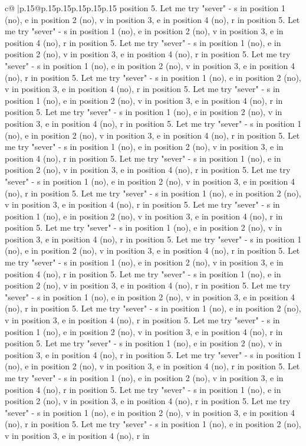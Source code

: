 \documentclass{article}
\begin{document}
{\begin{supertabular}{c@{$\;$}|p{.15\linewidth}@{}p{.15\linewidth}p{.15\linewidth}p{.15\linewidth}p{.15\linewidth}p{.15\linewidth}}
{{{position 5. Let me try "sever" {-} s in position 1 (no), e in position 2 (no), v in position 3, e in position 4 (no), r in position 5. Let me try "sever" {-} s in position 1 (no), e in position 2 (no), v in position 3, e in position 4 (no), r in position 5. Let me try "sever" {-} s in position 1 (no), e in position 2 (no), v in position 3, e in position 4 (no), r in position 5. Let me try "sever" {-} s in position 1 (no), e in position 2 (no), v in position 3, e in position 4 (no), r in position 5. Let me try "sever" {-} s in position 1 (no), e in position 2 (no), v in position 3, e in position 4 (no), r in position 5. Let me try "sever" {-} s in position 1 (no), e in position 2 (no), v in position 3, e in position 4 (no), r in position 5. Let me try "sever" {-} s in position 1 (no), e in position 2 (no), v in position 3, e in position 4 (no), r in position 5. Let me try "sever" {-} s in position 1 (no), e in position 2 (no), v in position 3, e in position 4 (no), r in position 5. Let me try "sever" {-} s in position 1 (no), e in position 2 (no), v in position 3, e in position 4 (no), r in position 5. Let me try "sever" {-} s in position 1 (no), e in position 2 (no), v in position 3, e in position 4 (no), r in position 5. Let me try "sever" {-} s in position 1 (no), e in position 2 (no), v in position 3, e in position 4 (no), r in position 5. Let me try "sever" {-} s in position 1 (no), e in position 2 (no), v in position 3, e in position 4 (no), r in position 5. Let me try "sever" {-} s in position 1 (no), e in position 2 (no), v in position 3, e in position 4 (no), r in position 5. Let me try "sever" {-} s in position 1 (no), e in position 2 (no), v in position 3, e in position 4 (no), r in position 5. Let me try "sever" {-} s in position 1 (no), e in position 2 (no), v in position 3, e in position 4 (no), r in position 5. Let me try "sever" {-} s in position 1 (no), e in position 2 (no), v in position 3, e in position 4 (no), r in position 5. Let me try "sever" {-} s in position 1 (no), e in position 2 (no), v in position 3, e in position 4 (no), r in position 5. Let me try "sever" {-} s in position 1 (no), e in position 2 (no), v in position 3, e in position 4 (no), r in position 5. Let me try "sever" {-} s in position 1 (no), e in position 2 (no), v in position 3, e in position 4 (no), r in position 5. Let me try "sever" {-} s in position 1 (no), e in position 2 (no), v in position 3, e in position 4 (no), r in position 5. Let me try "sever" {-} s in position 1 (no), e in position 2 (no), v in position 3, e in position 4 (no), r in position 5. Let me try "sever" {-} s in position 1 (no), e in position 2 (no), v in position 3, e in position 4 (no), r in position 5. Let me try "sever" {-} s in position 1 (no), e in position 2 (no), v in position 3, e in position 4 (no), r in position 5. Let me try "sever" {-} s in position 1 (no), e in position 2 (no), v in position 3, e in position 4 (no), r in position 5. Let me try "sever" {-} s in position 1 (no), e in position 2 (no), v in position 3, e in position 4 (no), r in position 5. Let me try "sever" {-} s in position 1 (no), e in position 2 (no), v in position 3, e in position 4 (no), r in }}}
\end{supertabular}}
\end{document}
